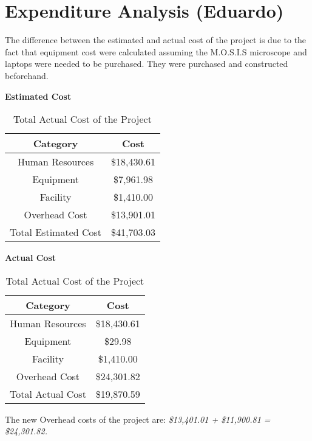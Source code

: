 \section{Expenditure Analysis (Eduardo)}
The difference between the estimated and actual cost of the project is due to the fact that equipment cost were calculated assuming the M.O.S.I.S microscope and laptops were needed to be purchased. They were purchased and constructed beforehand. \\
\begin{table}[H]
    \centering
    \textbf{Estimated Cost}\\
    \begin{tabular}{||c | c||} 
     \hline
     \rowcolor{cyan!50}
     Category & Cost \\ [0.5ex] 
     \hline
     Human Resources & \$18,430.61\\ 
     \hline
     Equipment & \$7,961.98\\
     \hline
     Facility & \$1,410.00\\
     \hline
     Overhead Cost & \$13,901.01\\
     \hline
     \rowcolor{teal!50}
     Total Estimated Cost & \$41,703.03\\
     \hline
    \end{tabular}
    \caption {Total Estimated Cost of the Project}
    \label {table:1}
\textbf{Actual Cost}\\
    \begin{tabular}{||c | c||} 
     \hline
     \rowcolor{cyan!50}
     Category & Cost \\ [0.5ex] 
     \hline
     Human Resources & \$18,430.61\\ 
     \hline
     Equipment & \$29.98 \\
     \hline
     Facility & \$1,410.00\\
     \hline
     Overhead Cost & \$24,301.82\\
     \hline
     \rowcolor{teal!50}
     Total Actual Cost & \$19,870.59\\
     \hline
    \end{tabular}
    \caption {Total Actual Cost of the Project}
    \label {table:2}
\end{table}
The new Overhead costs of the project are:
\textit{\$13,401.01 + \$11,900.81 = \$24,301.82.}\\